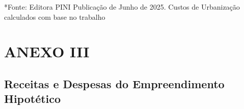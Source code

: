 \documentclass[
  10pt,
  a4paper]{article}
\begin{document}
*Fonte: Editora PINI Publicação de Junho de 2025. Custos de Urbanização
calculados com base no trabalho

\newpage

\section*{ANEXO III}\label{anexo-iii}

\subsection*{Receitas e Despesas do Empreendimento
Hipotético}\label{receitas-e-despesas-do-empreendimento-hipotuxe9tico}

\newpage

\thispagestyle{empty}
\end{document}
